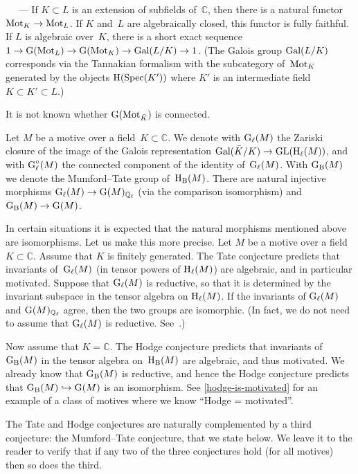 \documentclass[10pt,twoside,leqno]{article}
\renewcommand{\paragraph}[1]{\par\bigskip\refstepcounter{subsection}%
 {\normalfont\normalsize\scshape\noindent\thesubsection%
 \ifthenelse{\equal{#1}{}}%
 {}%
 {\ \textls{#1.}}%
 \ ---}%
}
\numberwithin{equation}{subsection}
\newcommand{\into}{\hookrightarrow}
\newcommand{\QQ}{\mathbb{Q}}
\newcommand{\QQl}{\QQ_{\ell}}
\newcommand{\CC}{\mathbb{C}}
\newcommand{\Spec}{\textnormal{Spec}}
\newcommand{\Gal}{\textnormal{Gal}}
\newcommand{\GL}{\textnormal{GL}}
\newcommand{\HH}{\textnormal{H}}
\newcommand{\Hl}{\HH_{\ell}}
\newcommand{\HB}{\HH_{\textnormal{B}}}
\newcommand{\Mot}{\textnormal{Mot}}
\newcommand{\GG}{\textnormal{G}}
\newcommand{\GB}{\GG_{\textnormal{B}}}
\newcommand{\Gl}{\GG_{\ell}}
\newcommand{\Glc}{\Gl^{\circ}}
\begin{document}
\paragraph{} %
If $K \subset L$ is an extension of subfields of~$\CC$,
then there is a natural functor $\Mot_K \to \Mot_L$.
If $K$ and~$L$ are algebraically closed, this functor is fully faithful.
If $L$ is algebraic over~$K$, there is a short exact sequence
$1 \to \GG(\Mot_L) \to \GG(\Mot_K) \to \Gal(L/K) \to 1$.
(The Galois group $\Gal(L/K)$ corresponds via the Tannakian formalism
with the subcategory of~$\Mot_K$ generated by
the objects $\HH(\Spec(K'))$ where $K'$ is an intermediate field
$K \subset K' \subset L$.)

It is not known whether $\GG(\Mot_{\bar K})$ is connected.

\begin{notation} %
 Let $M$ be a motive over a field~$K \subset \CC$.
 We denote with $\Gl(M)$ the Zariski closure of the image of
 the Galois representation $\Gal(\bar K/K) \to \GL(\Hl(M))$,
 and with $\Glc(M)$ the connected component of the identity of~$\Gl(M)$.
 With $\GB(M)$ we denote the Mumford--Tate group of~$\HB(M)$.
 There are natural injective morphisms 
 $\Gl(M) \to \GG(M)_{\QQl}$ (via the comparison isomorphism)
 and $\GB(M) \to \GG(M)$.
\end{notation}

\begin{remark} %
 In certain situations it is expected that the natural morphisms mentioned
 above are isomorphisms.
 Let us make this more precise.
 Let $M$ be a motive over a field~$K \subset \CC$.
 Assume that $K$ is finitely generated.
 The Tate conjecture predicts that invariants of~$\Gl(M)$
 (in tensor powers of $\Hl(M)$) are algebraic,
 and in particular motivated.
 Suppose that $\Gl(M)$ is reductive, so that it is determined
 by the invariant subspace in the tensor algebra on $\Hl(M)$.
 If the invariants of $\Gl(M)$ and $\GG(M)_{\QQl}$ agree,
 then the two groups are isomorphic.
 (In fact, we do not need to assume that $\Gl(M)$ is reductive.
 See~\cite{Moonen_remark}.)

 Now assume that $K = \CC$.
 The Hodge conjecture predicts that
 invariants of $\GB(M)$ in the tensor algebra on~$\HB(M)$
 are algebraic, and thus motivated.
 We already know that $\GB(M)$ is reductive,
 and hence the Hodge conjecture predicts that
 $\GB(M) \into \GG(M)$ is an isomorphism.
 See \cref{hodge-is-motivated} for an example
 of a class of motives where we know ``Hodge = motivated''.

 The Tate and Hodge conjectures are naturally complemented
 by a third conjecture: the Mumford--Tate conjecture,
 that we state below.
 We leave it to the reader to verify
 that if any two of the three conjectures hold (for all motives)
 then so does the third.
\end{remark}
\end{document}
